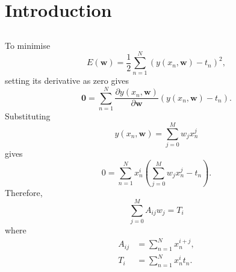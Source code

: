 \section{Introduction}


\subsection{}
To minimise 
%
\begin{equation}
E(\textbf{w}) = \frac{1}{2} \sum_{n = 1}^{N} \left( y(x_n, \textbf{w}) - t_n \right) ^ 2,
\end{equation}
%
setting its derivative as zero gives
%
\begin{equation}
\textbf{0} = \sum_{n = 1}^{N} \frac{\partial y(x_n, \textbf{w})}{\partial \textbf{w}} \left( y(x_n, \textbf{w}) - t_n \right).
\end{equation}
%
Substituting 
%
\begin{equation}
y(x_n, \textbf{w}) = \sum_{j = 0}^{M} w_j x_n^j
\end{equation}
%
gives
%
\begin{equation}
0 = \sum_{n = 1}^{N} x_n^i \left( \sum_{j = 0}^{M} w_j x_n^j - t_n \right).
\end{equation}
%
Therefore,
%
\begin{equation}
\sum_{j = 0}^{M} A_{ij} w_j = T_i
\end{equation}
%
where
%
\begin{equation}
\begin{aligned}
A_{ij} &= \sum_{n = 1}^{N} x_n^{i + j}, \\
T_i &= \sum_{n = 1}^{N} x_n^i t_n.
\end{aligned}
\end{equation}


